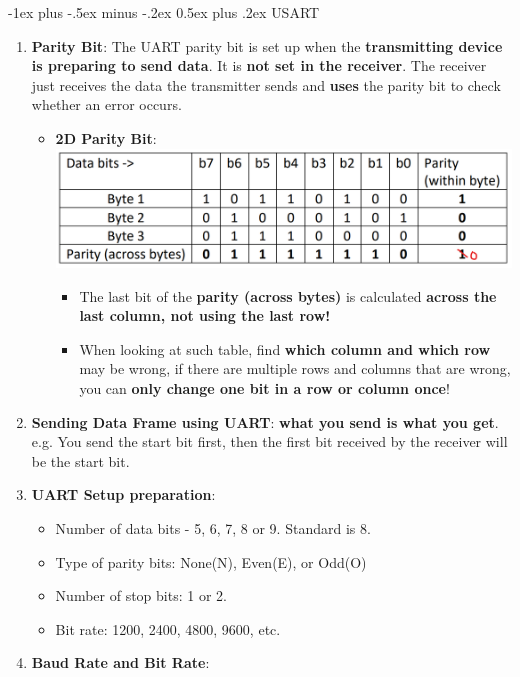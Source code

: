 \documentclass[10pt, landscape]{article}
\makeatletter
\renewcommand{\section}{\@startsection{section}{1}{0mm}%
                                {-1ex plus -.5ex minus -.2ex}%
                                {0.5ex plus .2ex}%
                                {\normalfont\large\bfseries}}
\makeatother
\begin{document}
\begin{multicols}{4}
\section{USART}
\begin{enumerate}
    \item \textbf{Parity Bit}: The UART parity bit is set up when the \textbf{transmitting device is preparing to send data}. It is \textbf{not set in the receiver}. The receiver just receives the data the transmitter sends and \textbf{uses} the parity bit to check whether an error occurs.
    \begin{itemize}
        \item \textbf{2D Parity Bit}:
        \includegraphics[width=1\linewidth]{images/2D-Parity-Bit.png}
        \begin{itemize}
            \item The last bit of the \textbf{parity (across bytes)} is calculated \textbf{across the last column, not using the last row!}
            \item When looking at such table, find \textbf{which column and which row} may be wrong, if there are multiple rows and columns that are wrong, you can \textbf{only change one bit in a row or column once}!
        \end{itemize}
    \end{itemize}
    \item \textbf{Sending Data Frame using UART}: \textbf{what you send is what you get}. e.g. You send the start bit first, then the first bit received by the receiver will be the start bit.
    \item \textbf{UART Setup preparation}:
    \begin{itemize}
        \item Number of data bits - 5, 6, 7, 8 or 9. Standard is 8.
        \item Type of parity bits: None(N), Even(E), or Odd(O)
        \item Number of stop bits: 1 or 2.
        \item Bit rate: 1200, 2400, 4800, 9600, etc. 
    \end{itemize}
    \item \textbf{Baud Rate and Bit Rate}:

\end{enumerate}
\end{multicols}
\end{document}
